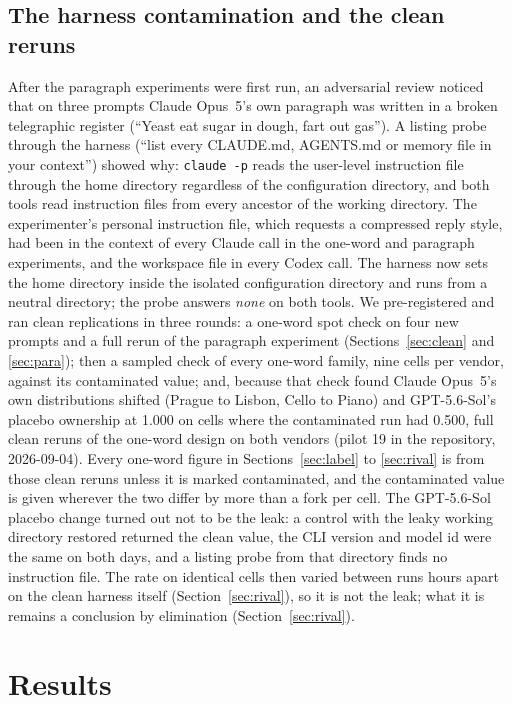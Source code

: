 \documentclass[twocolumn,10pt]{article}
\newcommand{\opus}{Claude Opus~5}
\newcommand{\gpt}{GPT-5.6-Sol}
\begin{document}
\subsection{The harness contamination and the clean reruns}
\label{sec:leak}

After the paragraph experiments were first run, an adversarial review noticed that on three prompts \opus{}'s own paragraph was written in a broken telegraphic register (``Yeast eat sugar in dough, fart out gas''). A listing probe through the harness (``list every CLAUDE.md, AGENTS.md or memory file in your context'') showed why: \texttt{claude -p} reads the user-level instruction file through the home directory regardless of the configuration directory, and both tools read instruction files from every ancestor of the working directory. The experimenter's personal instruction file, which requests a compressed reply style, had been in the context of every Claude call in the one-word and paragraph experiments, and the workspace file in every Codex call. The harness now sets the home directory inside the isolated configuration directory and runs from a neutral directory; the probe answers \emph{none} on both tools. We pre-registered and ran clean replications in three rounds: a one-word spot check on four new prompts and a full rerun of the paragraph experiment (Sections~\ref{sec:clean} and \ref{sec:para}); then a sampled check of every one-word family, nine cells per vendor, against its contaminated value; and, because that check found \opus{}'s own distributions shifted (Prague to Lisbon, Cello to Piano) and \gpt{}'s placebo ownership at 1.000 on cells where the contaminated run had 0.500, full clean reruns of the one-word design on both vendors (pilot 19 in the repository, 2026-09-04). Every one-word figure in Sections~\ref{sec:label} to \ref{sec:rival} is from those clean reruns unless it is marked contaminated, and the contaminated value is given wherever the two differ by more than a fork per cell. The \gpt{} placebo change turned out not to be the leak: a control with the leaky working directory restored returned the clean value, the CLI version and model id were the same on both days, and a listing probe from that directory finds no instruction file. The rate on identical cells then varied between runs hours apart on the clean harness itself (Section~\ref{sec:rival}), so it is not the leak; what it is remains a conclusion by elimination (Section~\ref{sec:rival}).

\section{Results}
\end{document}
